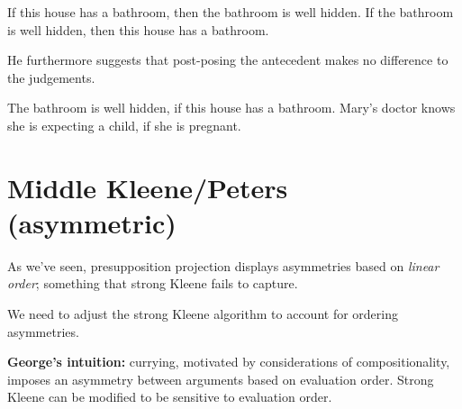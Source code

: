 \documentclass[nols,twoside,nofonts,nobib,nohyper]{tufte-handout}
\theoremstyle{definition}
\begin{document}
    \pex
    \a If this house has a bathroom, then the bathroom is well hidden.
    \a If the bathroom is well hidden, then this house has a bathroom.\\
    \phantom{,}\hfill\citep[p.\,186]{Schlenker2008}
    \xe

    He furthermore suggests that post-posing the antecedent makes no difference to the judgements.

    \pex
    \a The bathroom is well hidden, if this house has a bathroom.
    \a Mary's doctor knows she is expecting a child, if she is pregnant.\\
    \phantom{,}\hfill\citep[p.\,186]{Schlenker2008}
    \xe

\section{Middle Kleene/Peters (asymmetric)}

As we've seen, presupposition projection displays asymmetries based on \textit{linear order}; something that strong Kleene fails to capture.

We need to adjust the strong Kleene algorithm to account for ordering asymmetries.

\textbf{George's intuition:} currying, motivated by considerations of compositionality, imposes an asymmetry between arguments based on evaluation order. Strong Kleene can be modified to be sensitive to evaluation order.
\end{document}
